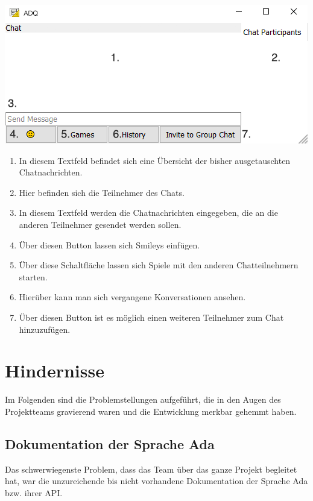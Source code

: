 \documentclass[12pt,a4paper,bibliography=totocnumbered,listof=totocnumbered]{scrartcl}
\begin{document}
\begin{minipage}{\linewidth}
	\centering
	\includegraphics[width=1.0\linewidth]{img/client_chat.png}
	
\end{minipage}
\vspace{1em}
\begin{enumerate}
	\item In diesem Textfeld befindet sich eine Übersicht der bisher ausgetauschten Chatnachrichten.
	\item Hier befinden sich die Teilnehmer des Chats.
	\item In diesem Textfeld werden die Chatnachrichten eingegeben, die an die anderen Teilnehmer gesendet werden sollen.
	\item Über diesen Button lassen sich Smileys einfügen.
	\item Über diese Schaltfläche lassen sich Spiele mit den anderen Chatteilnehmern starten.
	\item Hierüber kann man sich vergangene Konversationen ansehen.
	\item Über diesen Button ist es möglich einen weiteren Teilnehmer zum Chat hinzuzufügen.
\end{enumerate}

\newpage
\section{Hindernisse}
Im Folgenden sind die Problemstellungen aufgeführt, die in den Augen des Projektteams gravierend waren und die Entwicklung merkbar gehemmt haben.

\subsection{Dokumentation der Sprache Ada}
Das schwerwiegenste Problem, dass das Team über das ganze Projekt begleitet hat, war die unzureichende bis nicht vorhandene Dokumentation der Sprache Ada bzw. ihrer API.
\end{document}
